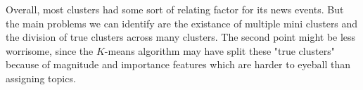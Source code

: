 \documentclass{article}
\begin{document}
Overall, most clusters had some sort of relating factor for its news events. But the main problems we can identify are the existance of multiple mini clusters and the division of true clusters across many clusters. The second point might be less worrisome, since the $K$-means algorithm may have split these "true clusters" because of magnitude and importance features which are harder to eyeball than assigning topics. 
\end{document}
